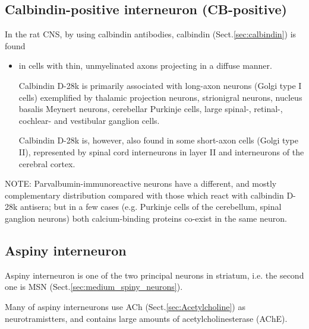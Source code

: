 \subsection{Calbindin-positive interneuron (CB-positive)}
\label{sec:Calbindin-positive-interneuron}
\label{sec:CB-positive-interneuron}

In the rat CNS, by using calbindin antibodies, calbindin
(Sect.\ref{sec:calbindin}) is found \citep{celio1990}

\begin{itemize}
  \item  in cells with thin, unmyelinated axons projecting in a diffuse manner.

Calbindin D-28k is primarily associated with long-axon neurons (Golgi type I
cells) exemplified by thalamic projection neurons, strionigral neurons, nucleus
basalis Meynert neurons, cerebellar Purkinje cells, large spinal-, retinal-,
cochlear- and vestibular ganglion cells.

Calbindin D-28k is, however, also found in some short-axon cells (Golgi type 
II), represented by spinal cord interneurons in layer II and interneurons of the
cerebral cortex.
  
\end{itemize}

NOTE: Parvalbumin-immunoreactive neurons have a different, and mostly
complementary distribution compared with those which react with calbindin D-28k
antisera; but in a few cases (e.g. Purkinje cells of the cerebellum, spinal
ganglion neurons) both calcium-binding proteins co-exist in the same neuron.



\subsection{Aspiny interneuron}
\label{sec:asppiny-interneurons}

Aspiny interneuron is one of the two principal neurons in striatum, i.e. the
second one is MSN (Sect.\ref{sec:medium_spiny_neurons}).

Many of aspiny interneurons use ACh (Sect.\ref{sec:Acetylcholine}) as
neurotramistters, and contains large amounts of acetylcholinesterase (AChE).




